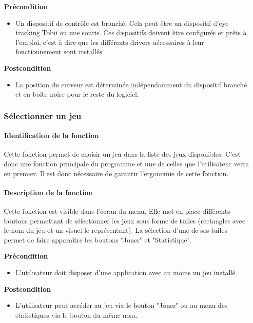 \documentclass{polytech/polytech}
\begin{document}
\textbf{Précondition}
\begin{itemize}
\item Un dispositif de contrôle est branché. Cela peut être un dispositif d'eye tracking Tobii ou une souris. Ces dispositifs doivent être configurés et prêts à l'emploi, c'est à dire que les différents drivers nécessaires à leur fonctionnement sont installés
\end{itemize}

\textbf{Postcondition}
\begin{itemize}
\item La position du curseur est déterminée indépendamment du dispositif branché et  en boite noire pour le reste du logiciel.
\end{itemize}

\subsubsection{Sélectionner un jeu}
\paragraph{Identification de la fonction}
Cette fonction permet de choisir un jeu dans la liste des jeux disponibles. C'est donc une fonction principale du programme et une de celles que l'utilisateur verra en premier. Il est donc nécessaire de garantir l'ergonomie de cette fonction.

\paragraph{Description de la fonction}
Cette fonction est visible dans l'écran du menu. Elle met en place différents boutons permettant de sélectionner les jeux sous forme de tuiles (rectangles avec le nom du jeu et un visuel le représentant). La sélection d'une de ses tuiles permet de faire apparaître  les boutons "Jouer" et "Statistique". 

\textbf{Précondition}
\begin{itemize}
\item L'utilisateur doit disposer d'une application avec au moins un jeu installé.
\end{itemize}

\textbf{Postcondition}
\begin{itemize}
\item L'utilisateur peut accéder au jeu via le bouton "Jouer" ou au menu des statistiques via le bouton du même nom.
\end{itemize}
\end{document}
